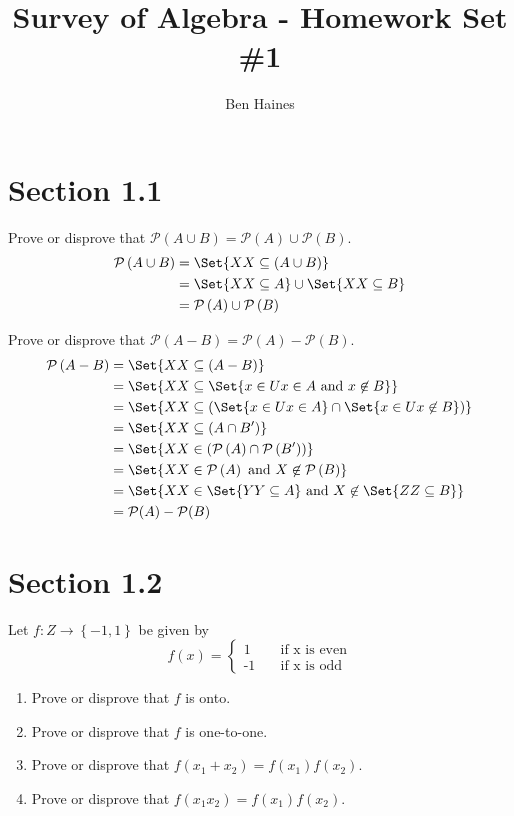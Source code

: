 \documentclass[paper=a4, fontsize=11pt]{jhwhw} %
\providecommand\given{} %
\begin{document}
\title{Survey of Algebra - Homework Set \#1}
\author{Ben Haines}
\section*{Section 1.1}
Prove or disprove that $\mathcal P (A\cup B) = \mathcal P (A) \cup \mathcal P (B)$.
\solution
\begin{align}
\begin{split}
\mathcal P \left({A \cup B}\right)
&= \Set{X \given X \subseteq (A \cup B)}\\
&=\Set{X\given X \subseteq A} \cup \Set{X\given X \subseteq B}\\
&=\mathcal P \left({A}\right) \cup \mathcal P \left({B}\right)
\end{split}                   
\end{align}

Prove or disprove that $\mathcal P (A-B) = \mathcal P (A) - \mathcal P (B)$.
\solution
\begin{align}
\begin{split}
\mathcal P \left({A - B}\right)
&= \Set{X\given X \subseteq (A - B)}\\
&= \Set{X\given X \subseteq \Set{x \in U \given x \in A \text{ and } x \not\in B}}\\
&= \Set{X\given X \subseteq (\Set{x \in U \given x \in A} \cap \Set{x \in U \given x \not\in B})}\\
&= \Set{X\given X \subseteq (A \cap B')}\\
&= \Set{X\given X \in (\mathcal P \left({A}\right) \cap \mathcal P \left({B'}\right)) }\\
&= \Set{X \given X \in \mathcal P \left({A}\right) \text{ and } X \not\in \mathcal P \left({B}\right) }\\
&= \Set{X \given X \in \Set{Y\given Y \subseteq A} \text{ and } X \not\in \Set{Z\given Z \subseteq B }}\\
&= \mathcal P(A) - \mathcal P(B)
\end{split}
\end{align}

\newpage
\section*{Section 1.2}
Let $f: Z \to \left\{ {-1, 1} \right\}$ be given by
\[  
f(x) =
     \begin{cases}
       \text{1} &\quad\text{if x is even}\\
       \text{-1} &\quad\text{if x is odd}\
     \end{cases}
\]
\begin{enumerate}
\item Prove or disprove that $f$ is onto.
\item Prove or disprove that $f$ is one-to-one.
\item Prove or disprove that $f(x_{1} + x_{2}) = f(x_{1})f(x_{2})$.
\item Prove or disprove that $f(x_{1}x_{2}) = f(x_{1})f(x_{2})$.
\end{enumerate}
\solution
\end{document}
